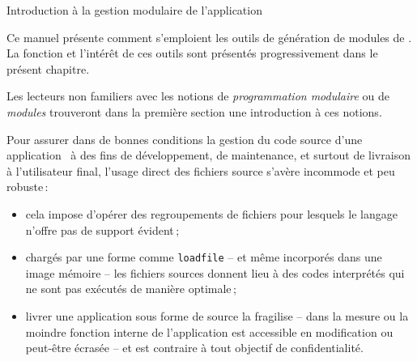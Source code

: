  {Introduction \`{a} la gestion modulaire de l'application}


Ce manuel pr\'{e}sente comment s'emploient les outils de g\'{e}n\'{e}ration
de modules de \LeLisp. La fonction et l'int\'{e}r\^{e}t de ces outils
sont pr\'{e}sent\'{e}s progressivement dans le pr\'{e}sent chapitre.

Les lecteurs non familiers avec les notions de {\em programmation
modulaire} ou de {\em modules} trouveront dans la premi\`{e}re section
une introduction \`{a} ces notions.







Pour assurer dans de bonnes conditions la gestion du code source
d'une application \LeLisp\ \`{a} des fins de d\'{e}veloppement, de
maintenance, et surtout de livraison \`{a} l'utilisateur final, 
l'usage direct des fichiers source s'av\`{e}re 
incommode et peu robuste\,:
\begin{itemize}
\item cela impose d'op\'{e}rer des regroupements de fichiers
pour lesquels le langage n'offre pas de support \'{e}vident\,;
\item charg\'{e}s par une forme comme {\tt loadfile} -- et m\^{e}me
incorpor\'{e}s dans une image m\'{e}moire -- les fichiers sources donnent lieu \`{a}
des codes interpr\'{e}t\'{e}s qui ne sont pas ex\'{e}cut\'{e}s de mani\`{e}re
optimale\,;
\item livrer une application sous forme de source la fragilise
-- dans la mesure ou la moindre fonction interne de l'application
est accessible en modification ou peut-\^{e}tre \'{e}cras\'{e}e -- et
est contraire \`{a} tout objectif de confidentialit\'{e}.
\end{itemize}




